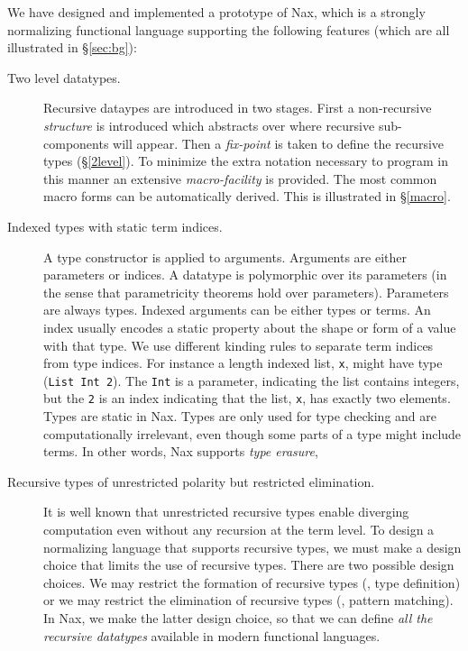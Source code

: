 We have designed and implemented a prototype of Nax, which is
a strongly normalizing functional language supporting the following features
(which are all illustrated in \S\ref{sec:bg}):
\begin{description}

\item[Two level datatypes.]
Recursive dataypes are introduced in two stages. First a non-recursive
{\em structure} is introduced which abstracts over where recursive 
sub-components will appear. Then a {\em fix-point} is taken to define
the recursive types (\S \ref{2level}). To minimize the extra notation necessary to program
in this manner an extensive {\em macro-facility} is provided. The most common
macro forms can be automatically derived. This is illustrated in \S\ref{macro}.

\item[Indexed types with static term indices.]
A type constructor is applied to arguments. Arguments
are either parameters or indices. A datatype is polymorphic over
its parameters (in the sense that parametricity theorems hold over parameters).
Parameters are always types.
Indexed arguments can be either types or terms. An index usually
encodes a static property about the shape or form of a value with
that type. We use different kinding rules to separate
term indices from type indices. For instance a length indexed list, \verb+x+,
might have type (\verb+List Int 2+). The \verb+Int+ is a parameter, indicating
the list contains integers, but the \verb+2+ is an index indicating
that the list, \verb+x+, has exactly two elements.  
Types are static in Nax. Types are only used for type checking
and are computationally irrelevant, even though some parts of a type might include terms.
In other words, Nax supports \emph{type erasure},

\item[Recursive types of unrestricted polarity but restricted elimination.]
It is well known that unrestricted recursive types enable diverging computation
even without any recursion at the term level. To design a normalizing language
that supports recursive types, we must make a design choice that limits
the use of recursive types. There are two possible
design choices. We may restrict the formation of recursive types
(\ie, type definition) or we may restrict the elimination of recursive types
(\ie, pattern matching). In Nax, we make the latter design choice, so that we can
define \emph{all the recursive datatypes} available in modern functional languages.


\end{description}
